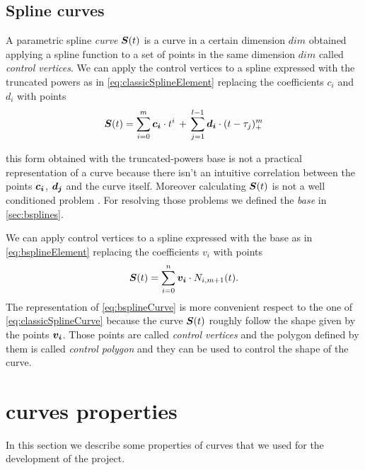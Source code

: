 \documentclass[dissertation.tex]{subfiles}
\begin{document}
\subsection{Spline curves}
A parametric spline \emph{curve} $\boldsymbol{S}(t)$ is a curve in a certain
dimension $dim$ obtained applying a spline function to a set of points
in the same dimension $dim$
called \emph{control vertices}. We can apply the control vertices to a
spline expressed with the truncated powers as in
\cref{eq:classicSplineElement} replacing the coefficients $c_i$ and
$d_i$ with points
\begin{equation}\label{eq:classicSplineCurve}
  \boldsymbol{S}(t)=\sum_{i=0}^m \boldsymbol{c_i}\cdot t^i\, +\, \sum_{j=1}^{l-1} \boldsymbol{d_i}\cdot (t-\tau_j)_+^m  
\end{equation}

this form obtained with the truncated-powers base is not a practical
representation of a curve because
there isn't an intuitive correlation between the points
$\boldsymbol{c_i}$, $\boldsymbol{d_j}$ and the curve itself. Moreover
calculating $\boldsymbol{S}(t)$ is not a well conditioned problem
\cite{deboor}.
 For resolving those problems we
defined the \emph{\bss base} in \cref{sec:bsplines}.

We can apply control vertices to a spline expressed with the \bs
base as in \cref{eq:bsplineElement} replacing the coefficients $v_i$
with points
\begin{equation}\label{eq:bsplineCurve}
  \boldsymbol{S}(t)=\sum_{i=0}^n\boldsymbol{v_i}\cdot N_{i,m+1}(t).
\end{equation}
The representation of \cref{eq:bsplineCurve} is more convenient
respect to the one of 
\cref{eq:classicSplineCurve} because the curve $\boldsymbol{S}(t)$ roughly
follow the shape given by the points $\boldsymbol{v_i}$. Those points are
called \emph{control vertices} and the polygon defined by them is
called \emph{control polygon} and they can be used to control the
shape of the curve.

\section{\bss curves properties}\label{sec:bsplineProp}
In this section we describe some properties of \bs curves that we
used for the development of the project.
\end{document}
